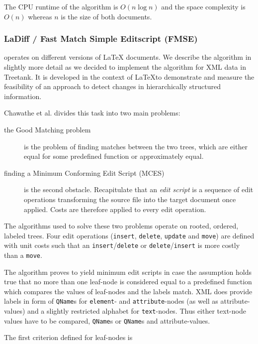 The CPU runtime of the algorithm is $O(n \log n)$ and the space complexity is $O(n)$ whereas $n$ is the size of both documents.

\subsubsection{LaDiff / Fast Match Simple Editscript (FMSE)\cite{chawathe1996change}}\label{subsec::ladiff}
operates on different versions of LaTeX documents. We describe the algorithm in slightly more detail as we decided to implement the algorithm for XML data in Treetank. It is developed in the context of \LaTeX to demonstrate and measure the feasibility of an approach to detect changes in hierarchically structured information. 

Chawathe et al. divides this task into two main problems:

\begin{description}
\item[the Good Matching problem] is the problem of finding matches between the two trees, which are either equal for some predefined function or approximately equal.
\item[finding a Minimum Conforming Edit Script (MCES)] is the second obstacle. Recapitulate that an \emph{edit script} is a sequence of edit operations transforming the source file into the target document once applied. Costs are therefore applied to every edit operation.
\end{description}

The algorithms used to solve these two problems operate on rooted, ordered, labeled trees. Four edit operations (\texttt{insert}, \texttt{delete}, \texttt{update} and \texttt{move}) are defined with unit costs such that an \texttt{insert}/\texttt{delete} or \texttt{delete}/\texttt{insert} is more costly than a \texttt{move}.

The algorithm proves to yield minimum edit scripts in case the assumption holds true that no more than one leaf-node is considered equal to a predefined function which compares the values of leaf-nodes and the labels match. XML does provide labels in form of \texttt{QName}s for \texttt{element}- and \texttt{attribute}-nodes (as well as attribute-values) and a slightly restricted alphabet for \texttt{text}-nodes. Thus either text-node values have to be compared, \texttt{QName}s or \texttt{QName}s and attribute-values.

The first criterion defined for leaf-nodes is 

